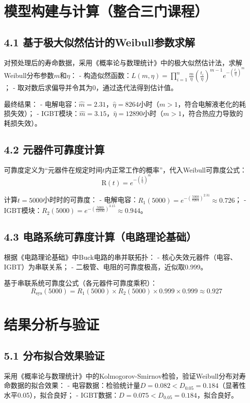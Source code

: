 \documentclass{article}
\newcommand{\reliable}{\text{R}(t)} %
\begin{document}
\section*{模型构建与计算（整合三门课程）}
\subsection*{4.1 基于极大似然估计的Weibull参数求解}
对预处理后的寿命数据，采用《概率论与数理统计》中的极大似然估计法，求解Weibull分布参数$m$和$\eta$：
- 构造似然函数：$L(m, \eta) = \prod_{i=1}^n \frac{m}{\eta} \left( \frac{t_i}{\eta} \right)^{m-1} e^{-\left( \frac{t_i}{\eta} \right)^m}$；
- 取对数后求偏导并令其为0，通过迭代法得到估计值。

最终结果：
- 电解电容：$\hat{m}=2.31$，$\hat{\eta}=8264$小时（$m>1$，符合电解液老化的耗损失效）；
- IGBT模块：$\hat{m}=3.15$，$\hat{\eta}=12890$小时（$m>1$，符合热应力导致的耗损失效）。

\subsection*{4.2 元器件可靠度计算}
可靠度定义为“元器件在规定时间$t$内正常工作的概率”，代入Weibull可靠度公式：
\[
\reliable = e^{-\left( \frac{t}{\eta} \right)^m}
\]

计算$t=5000$小时时的可靠度：
- 电解电容：$R_1(5000) = e^{-\left( \frac{5000}{8264} \right)^{2.31}} \approx 0.726$；
- IGBT模块：$R_2(5000) = e^{-\left( \frac{5000}{12890} \right)^{3.15}} \approx 0.944$。

\subsection*{4.3 电路系统可靠度计算（电路理论基础）}
根据《电路理论基础》中Buck电路的串并联拓扑：
- 核心失效元器件（电容、IGBT）为串联关系；
- 二极管、电阻的可靠度极高，近似取0.999。

基于串联系统可靠度公式（各元器件可靠度乘积）：
\[
R_{\text{sys}}(5000) = R_1(5000) \times R_2(5000) \times 0.999 \times 0.999 \approx 0.927
\]

\section*{结果分析与验证}
\subsection*{5.1 分布拟合效果验证}
采用《概率论与数理统计》中的Kolmogorov-Smirnov检验，验证Weibull分布对寿命数据的拟合效果：
- 电容数据：检验统计量$D=0.082 < D_{0.05}=0.184$（显著性水平0.05），拟合良好；
- IGBT数据：$D=0.075 < D_{0.05}=0.184$，拟合良好。
\end{document}

